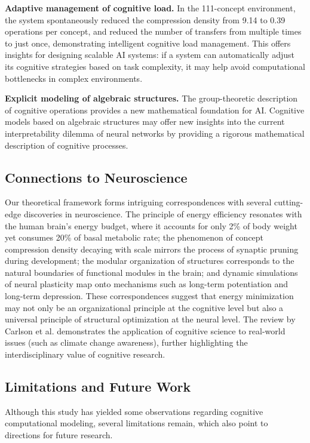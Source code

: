 \documentclass[10pt,onecolumn]{article}
\begin{document}
\textbf{Adaptive management of cognitive load.} In the 111-concept environment, the system spontaneously reduced the compression density from 9.14 to 0.39 operations per concept, and reduced the number of transfers from multiple times to just once, demonstrating intelligent cognitive load management. This offers insights for designing scalable AI systems: if a system can automatically adjust its cognitive strategies based on task complexity, it may help avoid computational bottlenecks in complex environments.

\textbf{Explicit modeling of algebraic structures.} The group-theoretic description of cognitive operations provides a new mathematical foundation for AI. Cognitive models based on algebraic structures may offer new insights into the current interpretability dilemma of neural networks by providing a rigorous mathematical description of cognitive processes.

\subsection{Connections to Neuroscience}

Our theoretical framework forms intriguing correspondences with several cutting-edge discoveries in neuroscience. The principle of energy efficiency resonates with the human brain’s energy budget, where it accounts for only 2\% of body weight yet consumes 20\% of basal metabolic rate; the phenomenon of concept compression density decaying with scale mirrors the process of synaptic pruning during development; the modular organization of structures corresponds to the natural boundaries of functional modules in the brain; and dynamic simulations of neural plasticity map onto mechanisms such as long-term potentiation and long-term depression. These correspondences suggest that energy minimization may not only be an organizational principle at the cognitive level but also a universal principle of structural optimization at the neural level. The review by Carlson et al. \cite{carlson2025attending} demonstrates the application of cognitive science to real-world issues (such as climate change awareness), further highlighting the interdisciplinary value of cognitive research.

\subsection{Limitations and Future Work}

Although this study has yielded some observations regarding cognitive computational modeling, several limitations remain, which also point to directions for future research.
\end{document}
